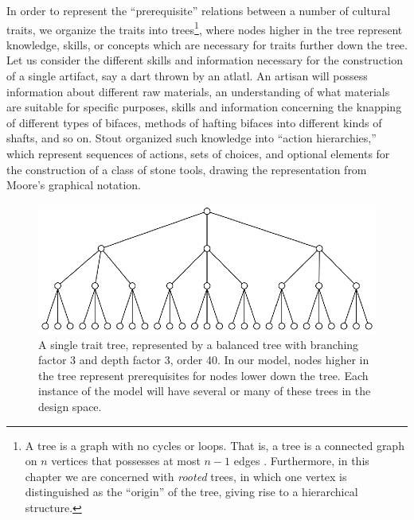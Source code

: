 In order to represent the ``prerequisite'' relations between a number of
cultural traits, we organize the traits into trees\footnote{A tree is a
  graph with no cycles or loops. That is, a tree is a connected graph on
  $n$ vertices that possesses at most $n-1$ edges
  \citep{diestel2010graph}. Furthermore, in this chapter we are
  concerned with \emph{rooted} trees, in which one vertex is
  distinguished as the ``origin'' of the tree, giving rise to a
  hierarchical structure.}, where nodes higher in the tree represent
knowledge, skills, or concepts which are necessary for traits further
down the tree. Let us consider the different skills and information
necessary for the construction of a single artifact, say a dart thrown
by an atlatl. An artisan will possess information about different raw
materials, an understanding of what materials are suitable for specific
purposes, skills and information concerning the knapping of different
types of bifaces, methods of hafting bifaces into different kinds of
shafts, and so on. Stout \citeyearpar{stout2011stone} organized such
knowledge into ``action hierarchies,'' which represent sequences of
actions, sets of choices, and optional elements for the construction of
a class of stone tools, drawing the representation from Moore's
\citeyearpar{moore2010grammars} graphical notation.

\begin{figure}[h] 
\centering 
\includegraphics[]{graphics/semanticaxelrod/balanced-trait-tree-3-3.eps} 
\caption{A single trait tree, represented by a balanced tree with branching factor 3 and depth factor 3, order 40.  In our model, nodes higher in the tree represent prerequisites for nodes lower down the tree.  Each instance of the model will have several or many of these trees in the design space.} 
\label{semax:img:trait-tree} 
\end{figure}

